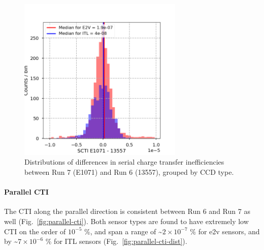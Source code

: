 \begin{figure}[H]
\begin{centering}
\includegraphics[width=0.7\textwidth]{sections/figures/baselineCharacterization/SCTI_13557_E1071_diff.png}
\caption{Distributions of differences in serial charge transfer inefficiencies between Run 7 (E1071) and Run 6 (13557), grouped by CCD type.}
\label{fig:serial-cti-dist}
\end{centering}
\end{figure}

\paragraph{Parallel CTI}\label{parallel-cti}

The CTI along the parallel direction is consistent between Run 6 and
Run 7 as well (Fig.~\ref{fig:parallel-cti}). Both sensor types are found to have extremely low CTI on the order of $10^{-5}$ \%,
and span a range of \textasciitilde$2 \times 10^{-7}$ \% for e2v sensors, and
by \textasciitilde$7 \times 10^{-6}$ \% for ITL sensors (Fig.~\ref{fig:parallel-cti-dist}).

